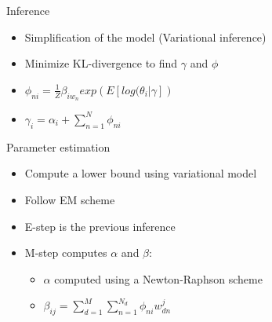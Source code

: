 \documentclass{beamer}
\begin{document}
\begin{frame}{Inference}
		\begin{itemize}
			\setlength{\itemsep}{100pt}
			\item Simplification of the model (Variational inference)
			\item Minimize KL-divergence to find $\gamma$ and $\phi$
			\item $\phi_{ni} = \frac{1}{Z} \beta_{i w_n} exp\left( E[log(\theta_i | \gamma] \right)$
			\item $\gamma_i = \alpha_i + \sum_{n=1}^{N} \phi_{ni}$
		\end{itemize}
\end{frame}


\begin{frame}{Parameter estimation}
		\begin{itemize}
			\setlength{\itemsep}{80pt}
			\item Compute a lower bound using variational model 
			\item Follow EM scheme
			\item E-step is the previous inference  
			\item M-step computes $\alpha$ and $\beta$:
				\begin{itemize}
					\item $\alpha$ computed using a Newton-Raphson scheme
					\item $\beta_{ij} = \sum_{d=1}^{M} \sum_{n=1}^{N_d} \phi_{ni} w_{dn}^j$
				\end{itemize}
		\end{itemize}
\end{frame}
\end{document}
